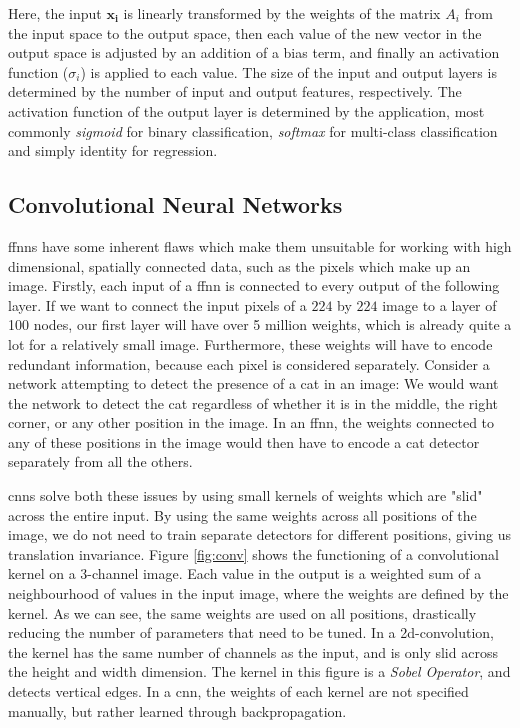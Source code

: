 \documentclass[UKenglish]{uiomasterthesis} %
\theoremstyle{definition}
\begin{document}
Here, the input $\bm{x_i}$ is linearly transformed by the weights of the matrix $A_i$ from the input space to the output space, then each value of the new vector in the output space is adjusted by an addition of a bias term, and finally an activation function ($\sigma_i$) is applied to each value. The size of the input and output layers is determined by the number of input and output features, respectively. The activation function of the output layer is determined by the application, most commonly {\it sigmoid} for binary classification, {\it softmax} for multi-class classification and simply identity for regression.


\subsection{Convolutional Neural Networks} \label{section:cnn}

\acp{ffnn} have some inherent flaws which make them unsuitable for working with high dimensional, spatially connected data, such as the pixels which make up an image. Firstly, each input of a \ac{ffnn} is connected to every output of the following layer. If we want to connect the input pixels of a $224$ by $224$ image to a layer of 100 nodes, our first layer will have over 5 million weights, which is already quite a lot for a relatively small image. Furthermore, these weights will have to encode redundant information, because each pixel is considered separately. Consider a network attempting to detect the presence of a cat in an image: We would want the network to detect the cat regardless of whether it is in the middle, the right corner, or any other position in the image. In an \ac{ffnn}, the weights connected to any of these positions in the image would then have to encode a cat detector separately from all the others.

\acp{cnn} solve both these issues by using small kernels of weights which are "slid" across the entire input. By using the same weights across all positions of the image, we do not need to train separate detectors for different positions, giving us translation invariance. Figure \ref{fig:conv} shows the functioning of a convolutional kernel on a 3-channel image. Each value in the output is a weighted sum of a neighbourhood of values in the input image, where the weights are defined by the kernel. As we can see, the same weights are used on all positions, drastically reducing the number of parameters that need to be tuned. In a 2d-convolution, the kernel has the same number of channels as the input, and is only slid across the height and width dimension. The kernel in this figure is a {\it Sobel Operator}, and detects vertical edges. In a \ac{cnn}, the weights of each kernel are not specified manually, but rather learned through backpropagation.
\end{document}
